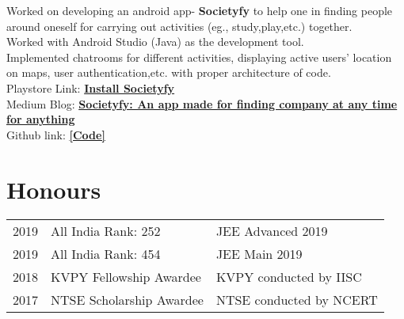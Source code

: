 \documentclass[letterpaper]{deedy-resume} %
\begin{document}
\begin{minipage}[t]{0.66\textwidth}
\sectionspace %



\textbullet{} Worked on developing an android app- \textbf{Societyfy} to help one in finding people around oneself for carrying out activities (eg., study,play,etc.) together. \\
\textbullet{} Worked with Android Studio (Java) as the development tool. \\
\textbullet{} Implemented chatrooms for different activities, displaying active users' location on maps, user authentication,etc. with proper architecture of code. \\
\textbullet{} Playstore Link: \href{https://play.google.com/store/apps/details?id=in.ac.mdg.iitr.societyfy}{\bf Install Societyfy} \\
\textbullet{} Medium Blog: \href{https://medium.com/mobile-development-group/societyfy-an-app-made-for-finding-company-at-anytime-for-anything-842e18151551}{\bf Societyfy: An app made for finding company at any time for anything} \\
\textbullet{} Github link: \href{https://github.com/praeclarumjj3/SOCIETYFY}{\bf [Code]} \\

\sectionspace %



\section{Honours} 

\begin{tabular}{rll}
2019	 & All India Rank: 252 & JEE Advanced 2019\\
2019	 & All India Rank: 454 & JEE Main 2019\\
2018	 & KVPY Fellowship Awardee & KVPY conducted by IISC\\
2017	 & NTSE Scholarship Awardee & NTSE conducted by NCERT\\

\end{tabular}

\sectionspace %


\end{minipage}
\end{document}
